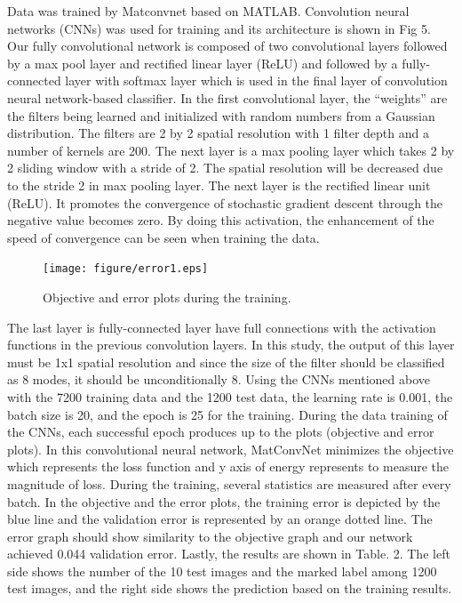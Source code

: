 Data was trained by Matconvnet based on MATLAB. Convolution neural networks (CNNs) was used for training and its architecture is shown in Fig 5. Our fully convolutional network is composed of two convolutional layers followed by a max pool layer and rectified linear layer (ReLU) and followed by a fully-connected layer with softmax layer which is used in the final layer of convolution neural network-based classifier. In the first convolutional layer, the “weights” are the filters being learned and initialized with random numbers from a Gaussian distribution. The filters are 2 by 2 spatial resolution with 1 filter depth and a number of kernels are 200. The next layer is a max pooling layer which takes 2 by 2 sliding window with a stride of 2. The spatial resolution will be decreased due to the stride 2 in max pooling layer. The next layer is the rectified linear unit (ReLU). It promotes the convergence of stochastic gradient descent through the negative value becomes zero. By doing this activation, the enhancement of the speed of convergence can be seen when training the data. 
\label{subsubsec3}
\begin{figure}
\centering
\texttt{[image: figure/error1.eps]}
\caption{Objective and error plots during the training.}
\label{fig:5}       
\end{figure}
The last layer is fully-connected layer have full connections with the activation functions in the previous convolution layers. In this study, the output of this layer must be 1x1 spatial resolution and since the size of the filter should be classified as 8 modes, it should be unconditionally 8. Using the CNNs mentioned above with the 7200 training data and the 1200 test data, the learning rate is 0.001, the batch size is 20, and the epoch is 25 for the training. 
During the data training of the CNNs, each successful epoch produces up to the plots (objective and error plots). In this convolutional neural network, MatConvNet minimizes the objective which represents the loss function and y axis of energy represents to measure the magnitude of loss. During the training, several statistics are measured after every batch. In the objective and the error plots, the training error is depicted by the blue line and the validation error is represented by an orange dotted line. The error graph should show similarity to the objective graph and our network achieved 0.044 validation error. Lastly, the results are shown in Table. 2. The left side shows the number of the 10 test images and the marked label among 1200 test images, and the right side shows the prediction based on the training results.
